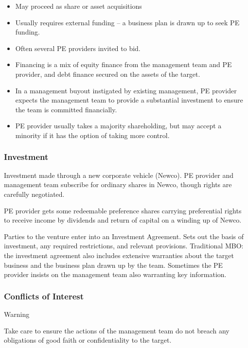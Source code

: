 \documentclass[
]{article}
\providecommand{\tightlist}{%
  \setlength{\itemsep}{0pt}\setlength{\parskip}{0pt}}
\newenvironment{env-90909da5-8ae5-47a3-962b-d797b4450caf}
{
    \savenotes\tcolorbox[blanker,breakable,left=5pt,borderline west={2pt}{-4pt}{orange}]
}
{
    \endtcolorbox\spewnotes
}
\begin{document}
\begin{itemize}
\tightlist
\item
  May proceed as share or asset acquisitions
\item
  Usually requires external funding -- a business plan is drawn up to
  seek PE funding.
\item
  Often several PE providers invited to bid.
\item
  Financing is a mix of equity finance from the management team and PE
  provider, and debt finance secured on the assets of the target.
\item
  In a management buyout instigated by existing management, PE provider
  expects the management team to provide a substantial investment to
  ensure the team is committed financially.
\item
  PE provider usually takes a majority shareholding, but may accept a
  minority if it has the option of taking more control.
\end{itemize}

\hypertarget{investment}{%
\subsubsection{Investment}\label{investment}}

Investment made through a new corporate vehicle (Newco). PE provider and
management team subscribe for ordinary shares in Newco, though rights
are carefully negotiated.

PE provider gets some redeemable preference shares carrying preferential
rights to receive income by dividends and return of capital on a winding
up of Newco.

Parties to the venture enter into an Investment Agreement. Sets out the
basis of investment, any required restrictions, and relevant provisions.
Traditional MBO: the investment agreement also includes extensive
warranties about the target business and the business plan drawn up by
the team. Sometimes the PE provider insists on the management team also
warranting key information.

\hypertarget{conflicts-of-interest}{%
\subsubsection{Conflicts of Interest}\label{conflicts-of-interest}}

\begin{env-90909da5-8ae5-47a3-962b-d797b4450caf}

Warning

Take care to ensure the actions of the management team do not breach any
obligations of good faith or confidentiality to the target.

\end{env-90909da5-8ae5-47a3-962b-d797b4450caf}
\end{document}
